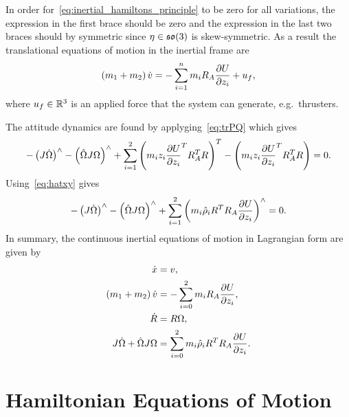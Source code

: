 In order for~\cref{eq:inertial_hamiltons_principle} to be zero for all variations, the expression in the first brace should be zero and the expression in the last two braces should by symmetric since \( \eta \in \mathfrak{so}(3) \) is skew-symmetric.
As a result the translational equations of motion in the inertial frame are
\begin{align*}
    \left( m_1 + m_2 \right) \dot{v} = - \sum_{i=1}^n m_i R_A \frac{\partial U}{\partial z_i} + u_f,
\end{align*}
where \( u_f \in \mathbb{R}^3 \) is an applied force that the system can generate, e.g.\ thrusters.

The attitude dynamics are found by applyging~\cref{eq:trPQ} which gives
\begin{align}
    -\left( J \dot{\Omega} \right)^\wedge - \left(  \hat{\Omega} J \Omega \right)^\wedge + \sum_{i=1}^{2} \left( m_i z_i \frac{\partial U}{\partial z_i}^T R_A^T R  \right)^T - \left( m_i z_i \frac{\partial U}{\partial z_i}^T R_A^T R   \right) = 0.
\end{align}
Using~\cref{eq:hatxy} gives
\begin{align}
    -\left( J \dot{\Omega} \right)^\wedge - \left(  \hat{\Omega} J \Omega \right)^\wedge + \sum_{i=1}^2 \left( m_i \hat{\rho}_i R^T R_A \frac{\partial U}{\partial z_i} \right)^\wedge  = 0.
\end{align}
In summary, the continuous inertial equations of motion in Lagrangian form are given by
\begin{align}
    \dot{x} &= v, \\
    \left( m_1 + m_2 \right) \dot{v} &= - \sum_{i=0}^2 m_i R_A \frac{\partial U}{\partial z_i}, \\
    \dot{R} &= R \Omega, \\
    J \dot{\Omega} + \hat{\Omega} J \Omega &= \sum_{i=0}^2 m_i \hat{\rho}_i R^T R_A \frac{\partial U}{\partial z_i} .
\end{align}

\section{Hamiltonian Equations of Motion}\label{eq:inertial_hamiltonian_eoms}


